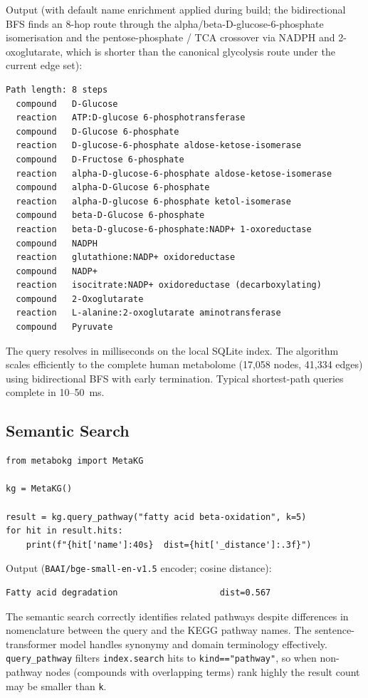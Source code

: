 \documentclass[10pt]{article}
\begin{document}
Output (with default name enrichment applied during build; the bidirectional
BFS finds an 8-hop route through the alpha/beta-D-glucose-6-phosphate
isomerisation and the pentose-phosphate / TCA crossover via NADPH and
2-oxoglutarate, which is shorter than the canonical glycolysis route under
the current edge set):
\begin{lstlisting}[style=bash, caption={}]
Path length: 8 steps
  compound   D-Glucose
  reaction   ATP:D-glucose 6-phosphotransferase
  compound   D-Glucose 6-phosphate
  reaction   D-glucose-6-phosphate aldose-ketose-isomerase
  compound   D-Fructose 6-phosphate
  reaction   alpha-D-glucose-6-phosphate aldose-ketose-isomerase
  compound   alpha-D-Glucose 6-phosphate
  reaction   alpha-D-glucose 6-phosphate ketol-isomerase
  compound   beta-D-Glucose 6-phosphate
  reaction   beta-D-glucose-6-phosphate:NADP+ 1-oxoreductase
  compound   NADPH
  reaction   glutathione:NADP+ oxidoreductase
  compound   NADP+
  reaction   isocitrate:NADP+ oxidoreductase (decarboxylating)
  compound   2-Oxoglutarate
  reaction   L-alanine:2-oxoglutarate aminotransferase
  compound   Pyruvate
\end{lstlisting}

The query resolves in milliseconds on the local SQLite index. The algorithm
scales efficiently to the complete human metabolome (17,058 nodes, 41,334
edges) using bidirectional BFS with early termination. Typical shortest-path
queries complete in 10--50~ms.

\subsection{Semantic Search}

\begin{lstlisting}[style=python, caption={Semantic pathway retrieval.}]
from metabokg import MetaKG

kg = MetaKG()

result = kg.query_pathway("fatty acid beta-oxidation", k=5)
for hit in result.hits:
    print(f"{hit['name']:40s}  dist={hit['_distance']:.3f}")
\end{lstlisting}

Output (\texttt{BAAI/bge-small-en-v1.5} encoder; cosine distance):
\begin{lstlisting}[style=bash, caption={}]
Fatty acid degradation                    dist=0.567
\end{lstlisting}

The semantic search correctly identifies related pathways despite differences
in nomenclature between the query and the KEGG pathway names. The
sentence-transformer model handles synonymy and domain terminology effectively.
\texttt{query\_pathway} filters \texttt{index.search} hits to
\texttt{kind=="pathway"}, so when non-pathway nodes (compounds with overlapping
terms) rank highly the result count may be smaller than \texttt{k}.
\end{document}
